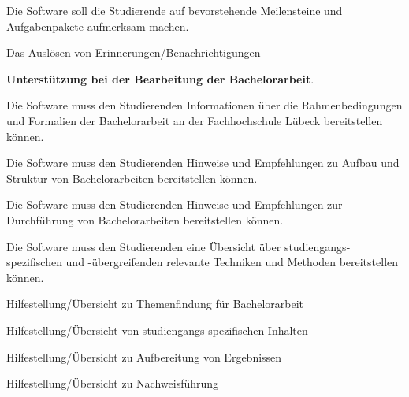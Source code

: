 \documentclass{scrreprt}
\begin{document}
\begin{enumerate} [label=\textbf{PR\arabic*}]
\begin{enumerate} [label=\textit{[Req1.\arabic*]}]
\bigskip
\item \label{anf:erinnerungenBenachrichtigungen}Die Software soll die Studierende auf bevorstehende Meilensteine und Aufgabenpakete aufmerksam machen.

\begin{enumerate} [label=\textit{[Req1.3.\arabic*]}]
\item \label{uanf:erinnerungAusloesen}Das Auslösen von Erinnerungen/Benachrichtigungen
\end{enumerate}
\end{enumerate}

\newpage
\item \label{prod:unterstuetzungBachelorarbeit} \textbf{Unterstützung bei der Bearbeitung der Bachelorarbeit}.
\begin{enumerate} [label=\textit{[Req2.\arabic*]}]

\item \label{anf:infRahmenbedingungenFormalien} Die Software muss den Studierenden Informationen über die Rahmenbedingungen und Formalien der Bachelorarbeit an der Fachhochschule Lübeck bereitstellen können.

\bigskip
\item \label{anf:infAufbauStruktur} Die Software muss den Studierenden Hinweise und Empfehlungen zu Aufbau und Struktur von Bachelorarbeiten bereitstellen können.

\bigskip
\item \label{anf:infDurchfuerungBachelorarbeit} Die Software muss den Studierenden Hinweise und Empfehlungen zur Durchführung von Bachelorarbeiten bereitstellen können.

\bigskip
\item \label{anf:infMethodenTechniken} Die Software muss den Studierenden eine Übersicht über studiengangs-spezifischen und -übergreifenden relevante Techniken und Methoden bereitstellen können.

\begin{enumerate} [label=\textit{[Req2.4.\arabic*]}]
\item \label{uanf:infThemenfindung} Hilfestellung/Übersicht zu Themenfindung für Bachelorarbeit
\item \label{uanf:infInhalt} Hilfestellung/Übersicht von studiengangs-spezifischen Inhalten
\item \label{uanf:infAufbereitungErgebnisse} Hilfestellung/Übersicht zu Aufbereitung von Ergebnissen
\item \label{uanf:infNachweisfuerung} Hilfestellung/Übersicht zu Nachweisführung
\end{enumerate}


\end{enumerate}
\end{enumerate}
\end{document}
